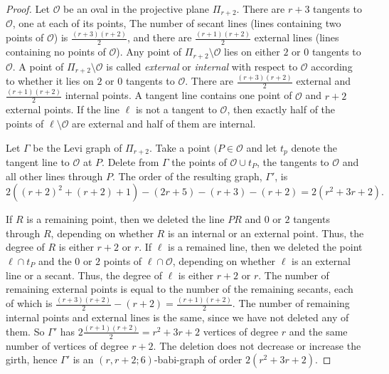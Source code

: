 \documentclass[a4paper,11pt]{article}
\begin{document}
\begin{proof}
Let $\mathcal{O}$ be an
oval in the projective plane $\Pi _{r+2}.$ There are $r+3$ tangents to $\mathcal{O}$, one at each of its points, The number of secant lines (lines containing two points of $\mathcal{O}$) is $\frac{(r+3)(r+2)}{2}$, and there are $\frac{(r+1)(r+2)}{2}$ external lines (lines containing no points of $\mathcal{O}$). Any point of $\Pi _{r+2}\setminus \mathcal{O}$ lies on either $2$ or $0$ tangents to $\mathcal{O}.$
A point of $\Pi _{r+2}\setminus \mathcal{O}$
is called \emph{external} or \emph{internal} with respect to $\mathcal{O}$ according
to whether it lies on $2$ or $0$ tangents to $\mathcal{O}.$
There are $\frac{(r+3)(r+2)}{2}$ external
and $\frac{(r+1)(r+2)}{2}$ internal points. 
A tangent line contains one point of $\mathcal{O}$ and $r+2$ external points. If the line $\ell $ is not a tangent to $\mathcal{O}$, then exactly half of the points of  $\ell \setminus \mathcal{O}$ are external and half of them are internal.

Let $\Gamma $ be the Levi graph of 
$\Pi _{r+2}$. Take a point $(P \in  \mathcal{O}$ and let $t_p$ denote the tangent line to 
$\mathcal{O}$ at $P$. Delete from $\Gamma $ the points of $\mathcal{O}\cup t_P$, the tangents to  
$\mathcal{O}$ and all 
other lines through $P$. The order of the resulting graph, $\Gamma'$, is 
$$2((r+2)^2+(r+2)+1)-(2r+5)-(r+3)-(r+2)=2(r^2+3r+2).$$ 

If $R$ is a remaining point, then we deleted the line $PR$ and $0$ or $2$ tangents through $R$, depending on whether $R$ is an internal or an external point. Thus, the degree of $R$ is either $r+2$ or $r$. If $\ell $ is a remained line, then we deleted the point $\ell \cap t_P$ and the $0$ or $2$ points of
$\ell \cap \mathcal{O}$, depending on whether $\ell $ is an external line or a secant. Thus, the degree of $\ell $ is either $r+2$ or $r$. The number of remaining external points is equal to the number of the remaining secants, each of which is $\frac{(r+3)(r+2)}{2}-(r+2)=\frac{(r+1)(r+2)}{2}$. 
The number of remaining internal points and external lines is the same, since we have not deleted any of them. So $\Gamma'$ has $2\frac{(r+1)(r+2)}{2}=r^2+3r+2$ vertices of degree $r$ and the same number of vertices of degree $r+2$. The deletion does not decrease or increase the girth, hence  $\Gamma'$ is an $(r,r+2;6)$-babi-graph of order $2(r^2+3r+2).$
\end{proof}
\end{document}
